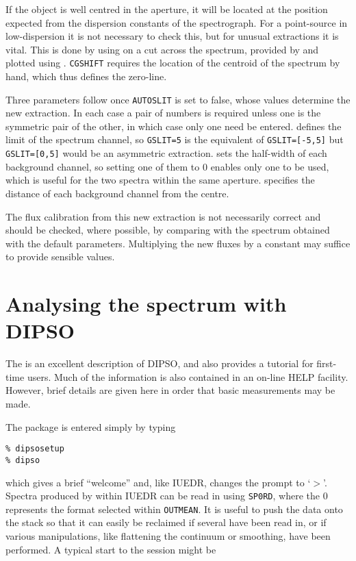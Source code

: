 If the object is well centred in the aperture, it will be located at the
position expected from the dispersion constants of the spectrograph.  For
a point-source in low-dispersion it is not necessary to check this, but for
unusual extractions it is vital.  This is done by using
 on a cut across the spectrum, provided 
by  and plotted using
\@.  
\verb+CGSHIFT+ requires the location of the centroid of the
spectrum by hand, which thus defines the zero-line.

Three parameters follow once \verb+AUTOSLIT+ is set to false, whose values
determine the new extraction.  In each case a pair of numbers is required
unless one is the symmetric pair of the other, in which case only one need be
entered.   defines the limit of the spectrum 
channel, so \verb+GSLIT=5+ is the equivalent of \verb+GSLIT=[-5,5]+ but 
\verb+GSLIT=[0,5]+
would be an asymmetric extraction.   sets the 
half-width of each
background channel, so setting one of them to 0 enables only one to be
used, which is useful for the two spectra within the same aperture.
 specifies the distance of each background 
channel from the centre.

The flux calibration from this new extraction is not necessarily correct and
should be checked, where possible, by comparing with the spectrum obtained
with the default parameters.  Multiplying the new fluxes by a constant may
suffice to provide sensible values.

\section{Analysing the spectrum with DIPSO}

The  is an excellent description of 
DIPSO, and also
provides a tutorial for first-time users.  Much of the information is also
contained in an on-line HELP facility. However, brief details are given here
in order that basic measurements may be made.

The package is entered simply by typing

\begin{verbatim}
% dipsosetup
% dipso
\end{verbatim}

which gives a brief ``welcome'' and, like IUEDR, changes the prompt to `$>$'.
Spectra produced by  within IUEDR can be 
read in using
\verb+SP0RD+, where the 0 represents the format selected within
\verb+OUTMEAN+\@.  It is useful to push the data onto the stack so that it can
easily be reclaimed if several have been read in, or if various manipulations,
like flattening the continuum or smoothing, have been performed.  A typical
start to the session might be

